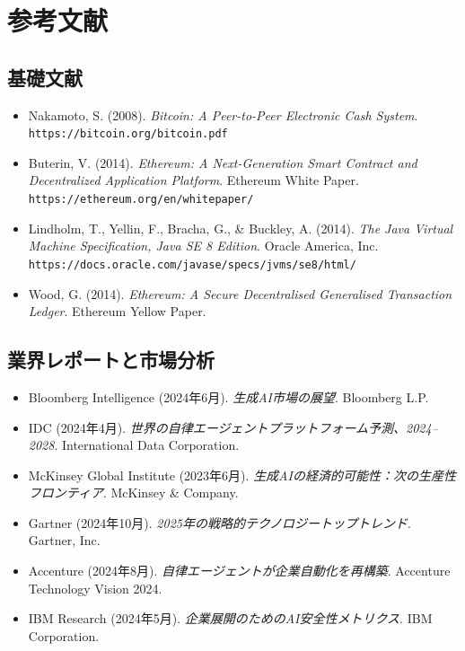 \documentclass[11pt]{article}
\begin{document}
\clearpage

\section*{参考文献}

\subsection*{基礎文献}

\begin{itemize}[leftmargin=*, label={}]
  \item Nakamoto, S. (2008). \textit{Bitcoin: A Peer-to-Peer Electronic Cash System}. \texttt{https://bitcoin.org/bitcoin.pdf}

  \item Buterin, V. (2014). \textit{Ethereum: A Next-Generation Smart Contract and Decentralized Application Platform}. Ethereum White Paper. \texttt{https://ethereum.org/en/whitepaper/}

  \item Lindholm, T., Yellin, F., Bracha, G., \& Buckley, A. (2014). \textit{The Java Virtual Machine Specification, Java SE 8 Edition}. Oracle America, Inc. \texttt{https://docs.oracle.com/javase/specs/jvms/se8/html/}

  \item Wood, G. (2014). \textit{Ethereum: A Secure Decentralised Generalised Transaction Ledger}. Ethereum Yellow Paper.
\end{itemize}

\subsection*{業界レポートと市場分析}

\begin{itemize}[leftmargin=*, label={}]
  \item Bloomberg Intelligence (2024年6月). \textit{生成AI市場の展望}. Bloomberg L.P.

  \item IDC (2024年4月). \textit{世界の自律エージェントプラットフォーム予測、2024--2028}. International Data Corporation.

  \item McKinsey Global Institute (2023年6月). \textit{生成AIの経済的可能性：次の生産性フロンティア}. McKinsey \& Company.

  \item Gartner (2024年10月). \textit{2025年の戦略的テクノロジートップトレンド}. Gartner, Inc.

  \item Accenture (2024年8月). \textit{自律エージェントが企業自動化を再構築}. Accenture Technology Vision 2024.

  \item IBM Research (2024年5月). \textit{企業展開のためのAI安全性メトリクス}. IBM Corporation.
\end{itemize}
\end{document}
